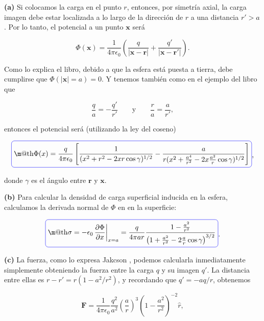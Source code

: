 \documentclass[a4paper,11pt]{article}
\makeatletter
\numberwithin{equation}{section}
\newcommand{\zerodel}{.\kern-\nulldelimiterspace}
\newcommand*{\boxcolor}{blue}
\renewcommand{\boxed}[1]{\textcolor{\boxcolor}{%
\tikz[baseline={([yshift=-1ex]current bounding box.center)}] \node [rectangle, minimum width=1ex,rounded corners,draw] {\normalcolor\m@th$\displaystyle#1$};}}
\makeatother
\begin{document}
\textbf{(a)} Si colocamos la carga en el punto $r$, entonces, por 
simetría axial, la carga imagen debe estar localizada a lo largo de la dirección 
de $r$ a una distancia $r' > a$. Por lo tanto, el potencial a un punto $\mathbf{x}$ será 

\begin{equation}
 \Phi(\mathbf{x}) = \frac{1}{4\pi\epsilon_0}\left(\frac{q}{|\mathbf{x}-\mathbf{r}|} + 
 \frac{q'}{|\mathbf{x}-\mathbf{r}'|} \right).
\end{equation}

Como lo explica el libro, debido a que la esfera está puesta a tierra, debe cumplirse 
que $\Phi(|\mathbf{x}| = a) = 0$. Y tenemos también como en el ejemplo del libro 
que 

\begin{equation}
 \frac{q}{a} = - \frac{q'}{r'} \qquad \text{y} \qquad \frac{r}{a} = \frac{a}{r'},
\end{equation}

entonces el potencial será (utilizando la ley del coseno)

\begin{equation}
 \boxed{\Phi(x) = \frac{q}{4\pi\epsilon_0}\left[\frac{1}{(x^2+r^2-2xr\cos{\gamma})^{1/2}}
 - \frac{a}{r(x^2+\frac{a^4}{r^2}-2x\frac{a^2}{r}\cos{\gamma})^{1/2}}\right]},
\end{equation}

donde $\gamma$ es el ángulo entre $\mathbf{r}$ y $\mathbf{x}$.

\vspace{.3cm}

\textbf{(b)} Para calcular la densidad de carga superficial inducida en la esfera, 
calculamos la derivada normal de $\Phi$ en en la superficie:

\begin{equation}
 \boxed{\sigma = -\epsilon_0\left\zerodel\frac{\partial \Phi}{\partial x}\right|_{x=a} = 
 \frac{q}{4\pi a r}\frac{1 - \frac{a^2}{r^2}}{\left(1 + \frac{a^2}{r^2} - 
 2\frac{a}{r}\cos{\gamma}\right)^{3/2}}}.
\end{equation}

\textbf{(c)} La fuerza, como lo expresa Jakcson \cite{jackson3}, podemos calcularla 
inmediatamente simplemente obteniendo la fuerza entre la carga $q$ y su imagen 
$q'$. La distancia entre ellas es $r - r' = r(1 - a^2/r^2)$, y recordando que 
$q' = - aq/r$, obtenemos 

\begin{equation}
 \mathbf{F} = \frac{1}{4\pi\epsilon_0}\frac{q^2}{a^2}\left(\frac{a}{r}\right)^3 
 \left(1 - \frac{a^2}{r^2} \right)^{-2} \hat{r},
\end{equation}
\end{document}
